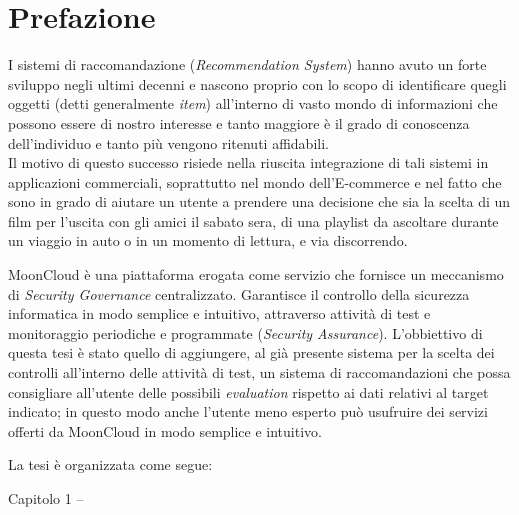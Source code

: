 \chapter{Prefazione}
I sistemi di raccomandazione (\textit{Recommendation System}) hanno avuto un forte sviluppo negli ultimi decenni e nascono proprio con lo scopo di identificare quegli oggetti (detti generalmente \textit{item}) all'interno di vasto mondo di informazioni che possono essere di nostro interesse e tanto maggiore è il grado di conoscenza dell'individuo e tanto più vengono ritenuti affidabili.\\
Il motivo di questo successo risiede nella riuscita integrazione di tali sistemi in applicazioni commerciali, soprattutto nel mondo dell’E-commerce e nel fatto che sono in grado di aiutare un utente a prendere una decisione che sia la scelta di un film per l'uscita con gli amici il sabato sera, di una playlist da ascoltare durante un viaggio in auto o in un momento di lettura, e via discorrendo. 


MoonCloud è una piattaforma erogata come servizio che fornisce un meccanismo di \textit{Security Governance} centralizzato. Garantisce il controllo della sicurezza informatica in modo semplice e intuitivo, attraverso attività di test e monitoraggio periodiche e programmate (\textit{Security Assurance}). L'obbiettivo di questa tesi è stato quello di aggiungere, al già presente sistema per la scelta dei controlli all'interno delle attività di test, un sistema di raccomandazioni che possa consigliare all'utente delle possibili \textit{evaluation} rispetto ai dati relativi al target indicato; in questo modo anche l'utente meno esperto può usufruire dei servizi offerti da MoonCloud in modo semplice e intuitivo.  


La tesi \`e organizzata come segue:
\begin{description}
    \item[Capitolo 1 -- ]
\end{description}




